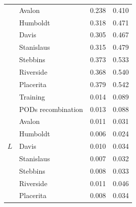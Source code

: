 \documentclass[a4paper, 12pt]{article}
\begin{document}
\begin{table}[ht]
\begin{tabular}{clll}
                                                           & Avalon             & 0.238           & 0.410 \\
                                                           & Humboldt           & 0.318 &0.471 \\
                                                           & Davis              & 0.305 & 0.467 \\
                                                           & Stanislaus         & 0.315 & 0.479 \\
                                                           & Stebbins           & 0.373 & 0.533\\
                                                           & Riverside          & 0.368 & 0.540\\
                                                           & Placerita          & 0.379 & 0.542\\ 
\hline
\multirow{9}{*}{$L$}                            & Training           & 0.014  & 0.089 \\
                                                           & PODs recombination & 0.013 & 0.088 \\
                                                           & Avalon             & 0.011 & 0.031 \\
                                                           & Humboldt        & 0.006 & 0.024\\
                                                           & Davis              & 0.010 & 0.034\\
                                                           & Stanislaus       & 0.007 & 0.032\\
                                                           & Stebbins          & 0.008 & 0.033 \\
                                                           & Riverside         & 0.011 & 0.046\\
                                                           & Placerita          & 0.008 & 0.034\\ 
\hline
\end{tabular}
\label{tab:supple_neutral_mse}
\end{table}
\newpage
\end{document}
